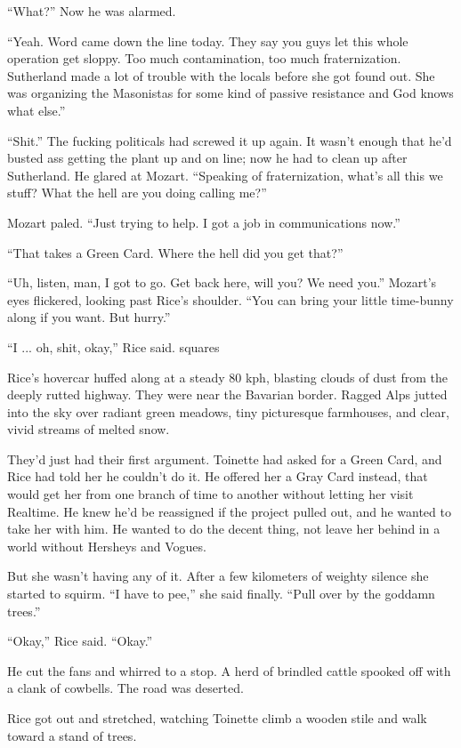 “What?” Now he was alarmed.

“Yeah. Word came down the line today. They say you guys let this whole operation get sloppy. Too much contamination, too much fraternization. Sutherland made a lot of trouble with the locals before she got found out. She was organizing the Masonistas for some kind of passive resistance and God knows what else.”

“Shit.” The fucking politicals had screwed it up again. It wasn’t enough that he’d busted ass getting the plant up and on line; now he had to clean up after Sutherland. He glared at Mozart. “Speaking of fraternization, what’s all this we stuff? What the hell are you doing calling me?”

Mozart paled. “Just trying to help. I got a job in communications now.”

“That takes a Green Card. Where the hell did you get that?”

“Uh, listen, man, I got to go. Get back here, will you? We need you.” Mozart’s eyes flickered, looking past Rice’s shoulder. “You can bring your little time-bunny along if you want. But hurry.”

“I ... oh, shit, okay,” Rice said.
squares

Rice’s hovercar huffed along at a steady 80 kph, blasting clouds of dust from the deeply rutted highway. They were near the Bavarian border. Ragged Alps jutted into the sky over radiant green meadows, tiny picturesque farmhouses, and clear, vivid streams of melted snow.

They’d just had their first argument. Toinette had asked for a Green Card, and Rice had told her he couldn’t do it. He offered her a Gray Card instead, that would get her from one branch of time to another without letting her visit Realtime. He knew he’d be reassigned if the project pulled out, and he wanted to take her with him. He wanted to do the decent thing, not leave her behind in a world without Hersheys and Vogues.

But she wasn’t having any of it. After a few kilometers of weighty silence she started to squirm. “I have to pee,” she said finally. “Pull over by the goddamn trees.”

“Okay,” Rice said. “Okay.”

He cut the fans and whirred to a stop. A herd of brindled cattle spooked off with a clank of cowbells. The road was deserted.

Rice got out and stretched, watching Toinette climb a wooden stile and walk toward a stand of trees.

